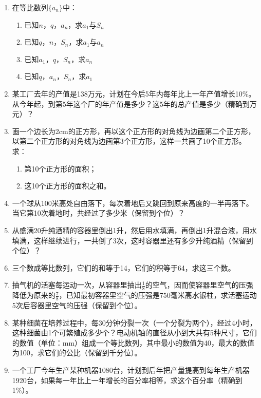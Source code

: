 \begin{enumerate}
    \item 在等比数列$\{a_n\}$中：
\begin{multicols}{2}
 \begin{enumerate}[(1)]
    \item 已知$n$，$q$，$a_n$，求$a_1$与$S_n$
    \item 已知$q$，$n$，$S_n$，求$a_1$与$a_n$
    \item 已知$a_1$，$q$，$S_n$，求$a_n$
    \item 已知$q$，$a_n$，$S_n$，求$a_1$
\end{enumerate}   
\end{multicols}
\item 某工厂去年的产值是138万元，计划在今后5年内每年比上一年产值增长10\%。从今年起，到第5年这个厂的年产值是多少？这5年的总产值是多少（精确到万元）？
\item 画一个边长为2cm的正方形，再以这个正方形的对角线为边画第二个正方形，以第二个正方形的对角线为边画第3个正方形，这样一共画了10个正方形。求：
\begin{multicols}{2}
\begin{enumerate}[(1)]
\item 第10个正方形的面积；
\item 这10个正方形的面积之和。
\end{enumerate}
\end{multicols}
\item 一个球从100米高处自由落下，每次着地后又跳回到原来高度的一半再落下。当它第10次着地时，共经过了多少米（保留到个位）？
\item 从盛满20升纯酒精的容器里倒出1升，然后用水填满，再倒出1升混合液，用水填满，这样继续进行，一共倒了3次，这时容器里还有多少升纯酒精（保留到个位）？
\item 三个数成等比数列，它们的和等于14，它们的积等于64，求这三个数。
\item 抽气机的活塞每运动一次，从容器里抽出$\frac{1}{8}$的空气，因而使容器里空气的压强降低为原来的$\frac{7}{8}$，已知最初容器里空气的压强是750毫米高水银柱，求活塞运动5次后容器里空气的压强（保留到个位）。
\item 某种细菌在培养过程中，每30分钟分裂一次（一个分裂为两个），经过4小时，这种细菌由1个可繁殖成多少个？电动机轴的直径从小到大共有5种尺寸，它们的数值（单位：mm）组成一个等比数列，其中最小的数值为40，最大的数值为100，求它们的公比（保留到千分位）。
\item 一个工厂今年生产某种机器1080台，计划到后年把产量提高到每年生产机器1920台，如果每一年比上一年增长的百分率相等，求这个百分率（精确到1\%）。
\end{enumerate}

